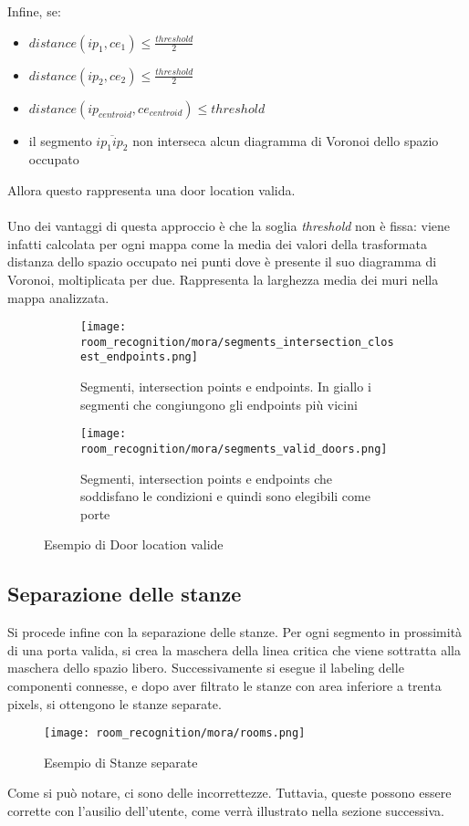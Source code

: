 Infine, se:
\begin{itemize}
  \item $distance(ip_1, ce_1) \leq \frac{threshold}{2}$
  \item $distance(ip_2, ce_2) \leq \frac{threshold}{2}$
  \item $distance(ip_{centroid}, ce_{centroid}) \leq threshold$
  \item il segmento $\overline{ip_1ip_2}$ non interseca alcun diagramma di Voronoi dello spazio occupato
\end{itemize}
Allora questo rappresenta una door location valida.\\\\
Uno dei vantaggi di questa approccio è che la soglia \textit{threshold} non è fissa: viene infatti calcolata per ogni mappa come la media dei valori della trasformata distanza dello spazio occupato nei punti dove è presente il suo diagramma di Voronoi, moltiplicata per due. Rappresenta la larghezza media dei muri nella mappa analizzata.
\begin{figure}[H]
  \centering
  \begin{subfigure}[t]{0.45\textwidth}
    \centering
    \texttt{[image: room\_recognition/mora/segments\_intersection\_closest\_endpoints.png]}
    \caption{Segmenti, intersection points e endpoints. In giallo i segmenti che congiungono gli endpoints più vicini}
  \end{subfigure}
  \begin{subfigure}[t]{0.45\textwidth}
    \centering
    \texttt{[image: room\_recognition/mora/segments\_valid\_doors.png]}
    \caption{Segmenti, intersection points e endpoints che soddisfano le condizioni e quindi sono elegibili come porte}
  \end{subfigure}
  \caption{Esempio di Door location valide}
\end{figure}
\subsection{Separazione delle stanze}
Si procede infine con la separazione delle stanze. Per ogni segmento in prossimità di una porta valida, si crea la maschera della linea critica che viene sottratta alla maschera dello spazio libero. Successivamente si esegue il labeling delle componenti connesse, e dopo aver filtrato le stanze con area inferiore a trenta pixels, si ottengono le stanze separate.
\begin{figure}[H]
  \centering
  \texttt{[image: room\_recognition/mora/rooms.png]}
  \caption{Esempio di Stanze separate}
\end{figure}
\noindent
Come si può notare, ci sono delle incorrettezze. Tuttavia, queste possono essere corrette con l'ausilio dell'utente, come verrà illustrato nella sezione successiva.

